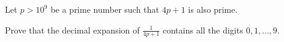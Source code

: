 Let $p > 10^9$ be a prime number such that $4p + 1$ is also prime.

Prove that the decimal expansion of $\frac{1}{4p+1}$ contains all the digits $0,1, \ldots, 9$.
